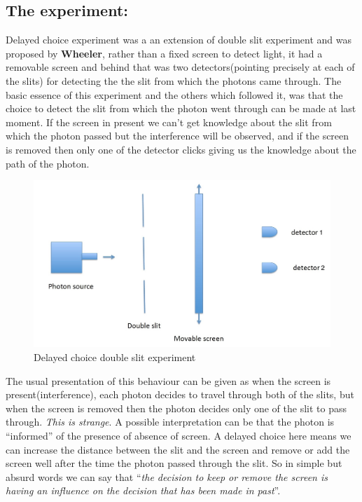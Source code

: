 \subsection{The experiment:}
    Delayed choice experiment was a an extension of double slit experiment and was proposed by \textbf{Wheeler}, rather than a fixed screen to detect light, it had a removable screen and behind that was two detectors(pointing precisely at each of the slits) for detecting the the slit from which the photons came through. The basic essence of this experiment and the others which followed it, was that the choice to detect the slit from which the photon went through can be made at last moment. If the screen in present we can't get knowledge about the slit from which the photon passed but the interference will be observed, and if the screen is removed then only one of the detector clicks giving us the knowledge about the path of the photon. \\
    \begin{figure}[h]
        \centering
        \includegraphics[scale = 0.19]{images/wheeler_delayed.jpg}
        \caption{Delayed choice double slit experiment}
        \label{fig:my_label}
    \end{figure}
    \par The usual presentation of this behaviour can be given as when the screen is present(interference), each photon decides to travel through both of the slits, but when the screen is removed then the photon decides only one of the slit to pass through. \emph{This is strange}. A possible interpretation can be that the photon is ``informed'' of the presence of absence of screen. A delayed choice here means we can increase the distance between the slit and the screen and remove or add the screen well after the time the photon passed through the slit. So in simple but absurd words we can say that ``\emph{the decision to keep or remove the screen is having an influence on the decision that has been made in past}''.
